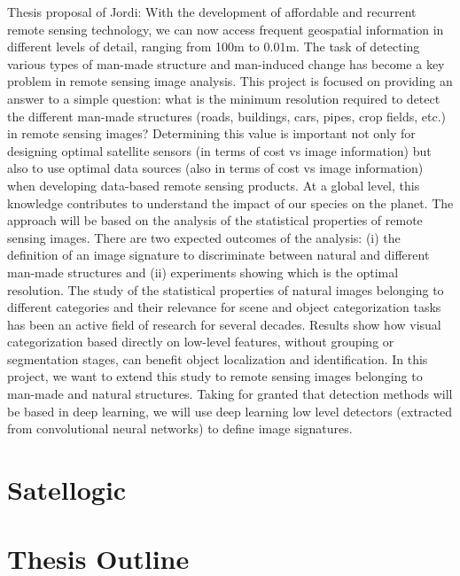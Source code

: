 Thesis proposal of Jordi: With the development of affordable and recurrent remote sensing technology, we can now access frequent geospatial information in different levels of detail, ranging from 100m to 0.01m. The task of detecting various types of man-made structure and man-induced change has become a key problem in remote sensing image analysis.
This project is focused on providing an answer to a simple question: what is the minimum resolution required to detect the different man-made structures (roads, buildings, cars, pipes, crop fields, etc.) in remote sensing images? Determining this value is important not only for designing optimal satellite sensors (in terms of cost vs image information) but also to use optimal data sources (also in terms of cost vs image information) when developing data-based remote sensing products. At a global level, this knowledge contributes to understand the impact of our species on the planet.
The approach will be based on the analysis of the statistical properties of remote sensing images. There are two expected outcomes of the analysis: (i) the definition of an image signature to discriminate between natural and different man-made structures and (ii) experiments showing which is the optimal resolution.
The study of the statistical properties of natural images belonging to different categories and their relevance for scene and object categorization tasks has been an active field of research for several decades. Results show how visual categorization based directly on low-level features, without grouping or segmentation stages, can benefit object localization and identification. In this project, we want to extend this study to remote sensing images belonging to man-made and natural structures. Taking for granted that detection methods will be based in deep learning, we will use deep learning low level detectors (extracted from convolutional neural networks) to define image signatures.




\section{Satellogic}


\section{Thesis Outline}